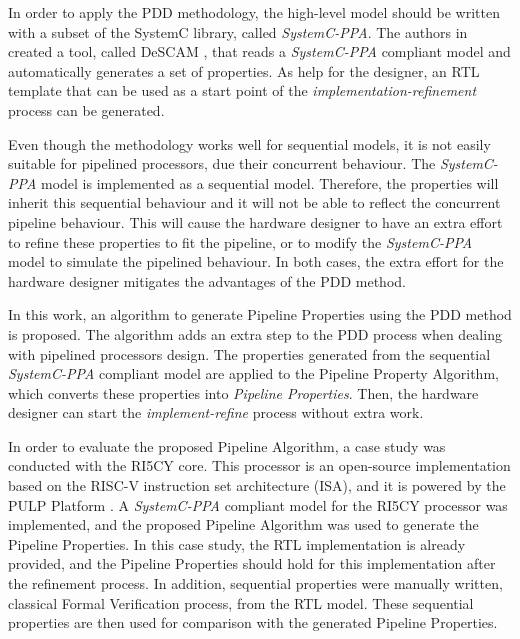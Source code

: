 In order to apply the PDD methodology, the high-level model should be written with a subset of the SystemC \cite{lib-systemc} library, called \textit{SystemC-PPA}. The authors in \cite{paper-pdd} created a tool, called DeSCAM \cite{descam}, that reads a \textit{SystemC-PPA} compliant model and automatically generates a set of properties. As help for the designer, an RTL template that can be used as a start point of the \textit{implementation-refinement} process can be generated.

Even though the methodology works well for sequential models, it is not easily suitable for pipelined processors, due their concurrent behaviour. The \textit{SystemC-PPA} model is implemented as a sequential model. Therefore, the properties will inherit this sequential behaviour and it will not be able to reflect the concurrent pipeline behaviour. This will cause the hardware designer to have an extra effort to refine these properties to fit the pipeline, or to modify the \textit{SystemC-PPA} model to simulate the pipelined behaviour. In both cases, the extra effort for the hardware designer mitigates the advantages of the PDD method.

In this work, an algorithm to generate Pipeline Properties using the PDD method is proposed. The algorithm adds an extra step to the PDD process when dealing with pipelined processors design. The properties generated from the sequential \textit{SystemC-PPA} compliant model are applied to the Pipeline Property Algorithm, which converts these properties into \textit{Pipeline Properties}. Then, the hardware designer can start the \textit{implement-refine} process without extra work.

In order to evaluate the proposed Pipeline Algorithm, a case study was conducted with the RI5CY   core. This processor is an open-source implementation based on the RISC-V instruction set architecture (ISA), and it is powered by the PULP Platform \cite{pulp}. A \textit{SystemC-PPA} compliant model for the RI5CY processor was implemented, and the proposed Pipeline Algorithm was used to generate the Pipeline Properties. In this case study, the RTL implementation is already provided, and the Pipeline Properties should hold for this implementation after the refinement process. In addition, sequential properties were manually written, classical Formal Verification process, from the RTL model. These sequential properties are then used for comparison with the generated Pipeline Properties.

